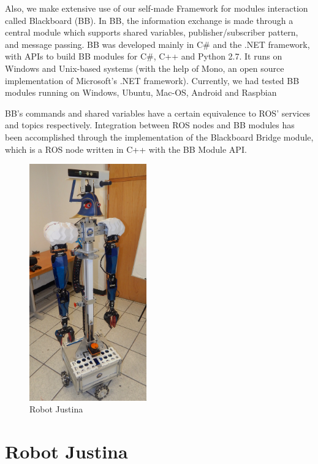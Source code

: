 \documentclass{llncs}
\begin{document}
Also, we make extensive use of our self-made Framework for modules interaction called Blackboard (BB). In BB, the information exchange is made through a central module which supports shared variables, publisher/subscriber pattern, and message passing. BB was developed mainly in C\# and the .NET framework, with APIs to build BB modules for C\#, C++ and Python 2.7. It runs on Windows and Unix-based systems (with the help of Mono, an open source implementation of Microsoft's .NET framework). Currently, we had tested BB modules running on Windows, Ubuntu, Mac-OS, Android and Raspbian

BB's commands and shared variables have a certain equivalence to ROS' services and topics respectively. Integration between ROS nodes and BB modules has been accomplished through the implementation of the Blackboard Bridge module, which is a ROS node written in C++ with the BB Module API.


\begin{figure}[h]
	\centering
	\includegraphics[width=0.45\textwidth]{Figures/justina2017.jpg}
	\caption{Robot Justina}
	\label{fig:justina}
\end{figure}

\section{Robot Justina}\label{sec:Justina}
\end{document}
